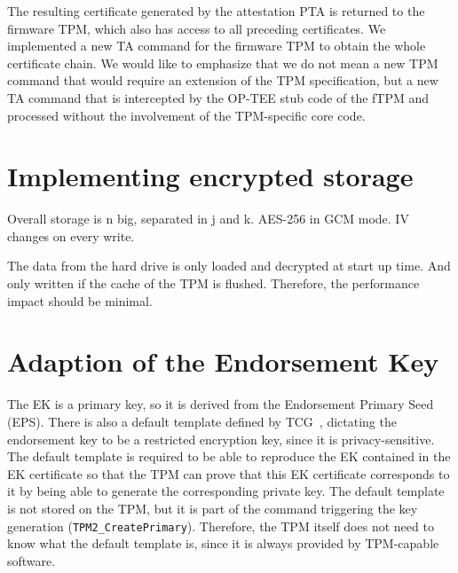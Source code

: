 The resulting certificate generated by the attestation PTA is returned to the firmware TPM, which also has access to all preceding certificates.
We implemented a new TA command for the firmware TPM to obtain the whole certificate chain.
We would like to emphasize that we do not mean a new TPM command that would require an extension of the TPM specification, but a new TA command that is intercepted by the OP-TEE stub code of the fTPM and processed without the involvement of the TPM-specific core code.





\section{Implementing encrypted storage}

Overall storage is n big, separated in j and k.
AES-256 in GCM mode.
IV changes on every write.

The data from the hard drive is only loaded and decrypted at start up time.
And only written if the cache of the TPM is flushed.
Therefore, the performance impact should be minimal.


\section{Adaption of the Endorsement Key}

The EK is a primary key, so it is derived from the Endorsement Primary Seed (EPS).
There is also a default template defined by TCG~\cite{tcg-ek}, dictating the endorsement key to be a restricted encryption key, since it is privacy-sensitive.
The default template is required to be able to reproduce the EK contained in the EK certificate so that the TPM can prove that this EK certificate corresponds to it by being able to generate the corresponding private key.
The default template is not stored on the TPM, but it is part of the command triggering the key generation (\texttt{TPM2\_CreatePrimary}).
Therefore, the TPM itself does not need to know what the default template is, since it is always provided by TPM-capable software.

